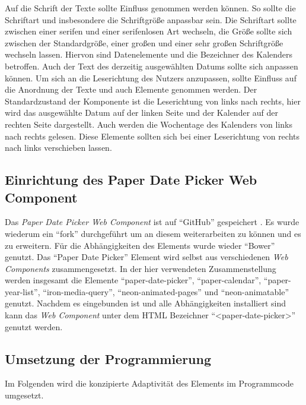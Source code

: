 \documentclass[12pt, paper=a4, bibtotoc, toc=listof, headsepline=true, numbers=endperiod]{scrreprt}
\begin{document}
		Auf die Schrift der Texte sollte Einfluss genommen werden können. So sollte die Schriftart und insbesondere die Schriftgröße anpassbar sein. Die Schriftart sollte zwischen einer serifen und einer serifenlosen Art wechseln, die Größe sollte sich zwischen der Standardgröße, einer großen und einer sehr großen Schriftgröße wechseln lassen. Hiervon sind Datenelemente und die Bezeichner des Kalenders betroffen. Auch der Text des derzeitig ausgewählten Datums sollte sich anpassen können.
		Um sich an die Leserichtung des Nutzers anzupassen, sollte Einfluss auf die Anordnung der Texte und auch Elemente genommen werden. Der Standardzustand der Komponente ist die Leserichtung von links nach rechts, hier wird das ausgewählte Datum auf der linken Seite und der Kalender auf der rechten Seite dargestellt. Auch werden die Wochentage des Kalenders von links nach rechts gelesen. Diese Elemente sollten sich bei einer Leserichtung von rechts nach links verschieben lassen.  
		\subsection{Einrichtung des Paper Date Picker Web Component}
		Das \emph{Paper Date Picker Web Component} ist auf \enquote{GitHub} gespeichert \cite{papDatPicGit}. Es wurde wiederum ein \enquote{fork} durchgeführt um an diesem weiterarbeiten zu können und es zu erweitern. Für die Abhängigkeiten des Elements wurde wieder \enquote{Bower} genutzt. Das \enquote{Paper Date Picker} Element wird selbst aus verschiedenen \emph{Web Components} zusammengesetzt. In der hier verwendeten Zusammenstellung werden insgesamt die Elemente \enquote{paper-date-picker}, \enquote{paper-calendar}, \enquote{paper-year-list}, \enquote{iron-media-query}, \enquote{neon-animated-pages} und \enquote{neon-animatable} genutzt. Nachdem es eingebunden ist und alle Abhängigkeiten installiert sind kann das \emph{Web Component} unter dem \ac{HTML} Bezeichner \enquote{<paper-date-picker>} genutzt werden.
		\subsection{Umsetzung der Programmierung}
		Im Folgenden wird die konzipierte Adaptivität des Elements im Programmcode umgesetzt. 
\end{document}
